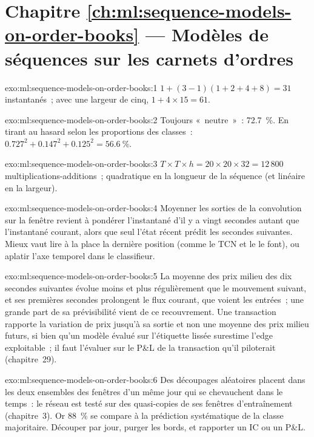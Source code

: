 \section*{Chapitre \ref{ch:ml:sequence-models-on-order-books} --- Modèles de séquences sur les carnets d'ordres}

\begin{solution}{exo:ml:sequence-models-on-order-books:1}
$1 + (3 - 1)(1 + 2 + 4 + 8) = 31$ instantanés~; avec une largeur de cinq, $1 + 4\times15 = 61$.
\end{solution}

\begin{solution}{exo:ml:sequence-models-on-order-books:2}
Toujours «~neutre~»~: 72.7~\%. En tirant au hasard selon les proportions des classes~: $0.727^2 + 0.147^2 + 0.125^2 = 56.6~\%$.
\end{solution}

\begin{solution}{exo:ml:sequence-models-on-order-books:3}
$T\times T\times h = 20\times20\times32 = 12\,800$ multiplications-additions~; quadratique en la longueur de la séquence (et linéaire en la
largeur).
\end{solution}

\begin{solution}{exo:ml:sequence-models-on-order-books:4}
Moyenner les sorties de la convolution sur la fenêtre revient à pondérer l'instantané d'il y a vingt secondes autant que l'instantané courant,
alors que seul l'état récent prédit les secondes suivantes. Mieux vaut lire à la place la dernière position (comme le TCN et le 
le font), ou aplatir l'axe temporel dans le classifieur.
\end{solution}

\begin{solution}{exo:ml:sequence-models-on-order-books:5}
La moyenne des prix milieu des dix secondes suivantes évolue moins et plus régulièrement que le mouvement suivant, et ses premières secondes prolongent le
flux courant, que voient les entrées~; une grande part de sa prévisibilité vient de ce recouvrement. Une transaction rapporte la variation de prix jusqu'à sa sortie
et non une moyenne des prix milieu futurs, si bien qu'un modèle évalué sur l'étiquette lissée surestime l'edge exploitable~; il faut l'évaluer
sur le P\&L de la transaction qu'il piloterait (chapitre~29).
\end{solution}

\begin{solution}{exo:ml:sequence-models-on-order-books:6}
Des découpages aléatoires placent dans les deux ensembles des fenêtres d'un même jour qui se chevauchent dans le temps~: le réseau est testé sur des quasi-copies de
ses fenêtres d'entraînement (chapitre~3). Or 88~\% se compare à la prédiction systématique de la classe majoritaire. Découper par jour,
purger les bords, et rapporter un IC ou un P\&L.
\end{solution}

